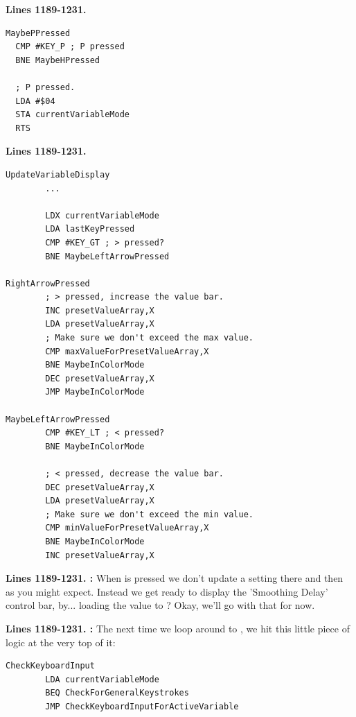 \clearpage
\textbf{Lines 1189-1231. } 
\begin{lstlisting}[caption=From \icode{CheckKeyboardInput}.]
MaybePPressed   
  CMP #KEY_P ; P pressed
  BNE MaybeHPressed

  ; P pressed.
  LDA #$04
  STA currentVariableMode
  RTS 
\end{lstlisting}
\textbf{Lines 1189-1231. } 
\begin{lstlisting}[caption=From \icode{CheckKeyboardInputForActiveVariable}. Pressing the \icode{<} and > keys increments and
decrements the value in presetValueArray pointed to by \icode{X}\, i.e. \icode{currentVariableMode}.]
UpdateVariableDisplay   
        ...

        LDX currentVariableMode
        LDA lastKeyPressed
        CMP #KEY_GT ; > pressed?
        BNE MaybeLeftArrowPressed

RightArrowPressed
        ; > pressed, increase the value bar.
        INC presetValueArray,X
        LDA presetValueArray,X
        ; Make sure we don't exceed the max value.
        CMP maxValueForPresetValueArray,X
        BNE MaybeInColorMode
        DEC presetValueArray,X
        JMP MaybeInColorMode

MaybeLeftArrowPressed   
        CMP #KEY_LT ; < pressed?
        BNE MaybeInColorMode

        ; < pressed, decrease the value bar.
        DEC presetValueArray,X
        LDA presetValueArray,X
        ; Make sure we don't exceed the min value.
        CMP minValueForPresetValueArray,X
        BNE MaybeInColorMode
        INC presetValueArray,X
\end{lstlisting}
\clearpage

\textbf{Lines 1189-1231. :} When  is pressed we don't
update a setting there and then as you might expect. Instead we get ready to display the 'Smoothing
Delay' control bar, by... loading the value  to ? Okay, we'll
go with that for now.

\textbf{Lines 1189-1231. :}  The next time we loop around
to , we hit this little piece of logic at the very top of it:

\begin{lstlisting}
CheckKeyboardInput   
        LDA currentVariableMode
        BEQ CheckForGeneralKeystrokes
        JMP CheckKeyboardInputForActiveVariable
\end{lstlisting}

